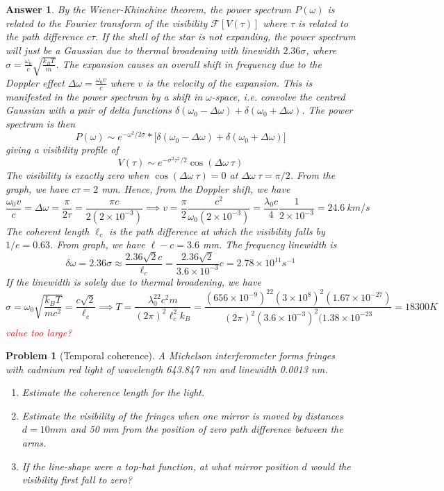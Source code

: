 \documentclass[a4paper]{article}
\newtheorem{ans}{Answer}
\theoremstyle{new}
\newtheorem{qns}{Problem}
\begin{document}
\begin{ans}
By the Wiener-Khinchine theorem, the power spectrum $P(\omega)$ is related to the Fourier transform of the visibility $\mathcal{F}[V(\tau)]$ where $\tau$ is related to the path difference $c\tau$. If the shell of the star is not expanding, the power spectrum will just be a Gaussian due to thermal broadening with linewidth $2.36\sigma$, where $\sigma=\frac{\omega_0}{c}\sqrt{\frac{k_BT}{m}}$. The expansion causes an overall shift in frequency due to the Doppler effect $\Delta\omega=\frac{\omega_0v}{c}$ where $v$ is the velocity of the expansion. This is manifested in the power spectrum by a shift in $\omega$-space, i.e. convolve the centred Gaussian with a pair of delta functions $\delta(\omega_0-\Delta\omega)+\delta(\omega_0+\Delta\omega)$. The power spectrum is then
$$P(\omega)\sim e^{-\omega^2/2\sigma}*\bigg[\delta(\omega_0-\Delta\omega)+\delta(\omega_0+\Delta\omega)\bigg]$$
giving a visibility profile of
$$V(\tau)\sim e^{-\sigma^2\tau^2/2}\cos(\Delta\omega~\tau)$$
The visibility is exactly zero when $\cos(\Delta\omega~\tau)=0$ at $\Delta\omega~\tau=\pi/2$. From the graph, we have $c\tau=2$ mm. Hence, from the Doppler shift, we have
$$\frac{\omega_0v}{c}=\Delta\omega=\frac{\pi}{2\tau}=\frac{\pi c}{2(2\times10^{-3})}\implies v=\frac{\pi}{2}\frac{c^2}{\omega_0(2\times10^{-3})}=\frac{\lambda_0c}{4}\frac{1}{2\times10^{-3}}=24.6~km/s$$
The coherent length $\ell_c$ is the path difference at which the visibility falls by $1/e=0.63$. From graph, we have $\ell-c=3.6$ mm. The frequency linewidth is 
$$\delta\omega=2.36\sigma\approx\frac{2.36\sqrt{2}c}{\ell_c}=\frac{2.36\sqrt{2}}{3.6\times10^{-3}}c=2.78\times10^{11}s^{-1}$$
If the linewidth is solely due to thermal broadening, we have
$$\sigma=\omega_0\sqrt{\frac{k_BT}{mc^2}}=\frac{c\sqrt{2}}{\ell_c}\implies T=\frac{\lambda_0^22c^2m}{(2\pi)^2\ell_c^2k_B}=\frac{(656\times10^{-9})^22(3\times10^8)^2(1.67\times10^{-27})}{(2\pi)^2(3.6\times10^{-3})^2(1.38\times10^{-23}}=18300 K$$
\textcolor{red}{value too large?}
\end{ans}
\newpage
\begin{qns}[Temporal coherence]
A Michelson interferometer forms fringes with cadmium red light of wavelength 643.847 nm and linewidth 0.0013 nm.
\begin{enumerate}[label=(\alph*)]
\item Estimate the coherence length for the light.
\item  Estimate the visibility of the fringes when one mirror is moved by distances $d= 10 mm$ and 50 mm from the position of zero path difference between the arms.
\item If the line-shape were a top-hat function, at what mirror position $d$ would the visibility first fall to zero?
\end{enumerate}
\end{qns}
\end{document}
